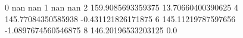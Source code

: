 0 nan nan
1 nan nan
2 159.9085693359375 13.70660400390625
4 145.77084350585938 -0.431121826171875
6 145.11219787597656 -1.0897674560546875
8 146.20196533203125 0.0
